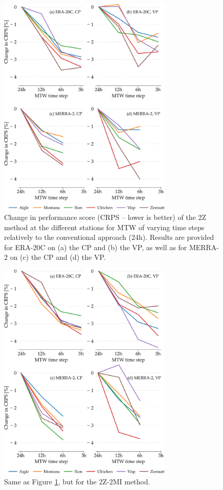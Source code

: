 \documentclass[hess, manuscript]{copernicus}
\begin{document}
	\begin{figure}[htb]
		\includegraphics[width=8.3cm]{fig03.pdf}
		\caption{Change in performance score (CRPS -- lower is better) of the 2Z method at the different stations for MTW of varying time steps relatively to the conventional approach (24h). Results are provided for ERA-20C on (a) the CP and (b) the VP, as well as for MERRA-2 on (c) the CP and (d) the VP.}
		\label{fig:plots_CRPS_2Z}
	\end{figure}
	
	\begin{figure}[htb]
		\includegraphics[width=8.3cm]{fig04.pdf}
		\caption{Same as Figure \ref{fig:plots_CRPS_2Z}, but for the 2Z-2MI method.}
		\label{fig:plots_CRPS_2Z-2MI}
	\end{figure}
	
\end{document}
